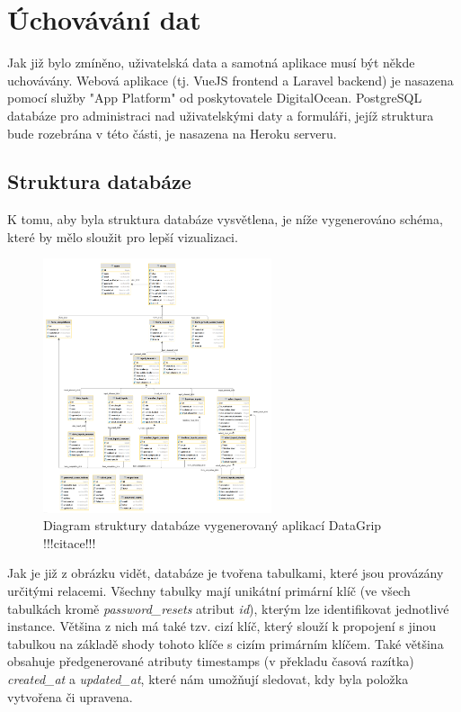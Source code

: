 \section{Úchovávání dat}

Jak již bylo zmíněno, uživatelská data a samotná aplikace musí být někde uchovávány. Webová aplikace (tj. VueJS frontend a Laravel backend) je nasazena pomocí služby "App Platform" od poskytovatele DigitalOcean. PostgreSQL databáze pro administraci nad uživatelskými daty a formuláři, jejíž struktura bude rozebrána v této části, je nasazena na Heroku serveru. 

\subsection{Struktura databáze}
K tomu, aby byla struktura databáze vysvětlena, je níže vygenerováno schéma, které by mělo sloužit pro lepší vizualizaci.

\begin{figure}[h]
	\centering %
	\includegraphics[width=0.6\textwidth]{img/db_diagram.png} %
	\caption{Diagram struktury databáze vygenerovaný aplikací DataGrip !!!citace!!!} %
	\label{fig:db_diagram} %
\end{figure}

Jak je již z obrázku vidět, databáze je tvořena tabulkami, které jsou provázány určitými relacemi. Všechny tabulky mají unikátní primární klíč (ve všech tabulkách kromě \textit{password\_resets} atribut \textit{id}), kterým lze identifikovat jednotlivé instance. Většina z nich má také tzv. cizí klíč, který slouží k propojení s jinou tabulkou na základě shody tohoto klíče s cizím primárním klíčem. Také většina obsahuje předgenerované atributy timestamps (v překladu časová razítka) \textit{created\_at} a \textit{updated\_at}, které nám umožňují sledovat, kdy byla položka vytvořena či upravena.

